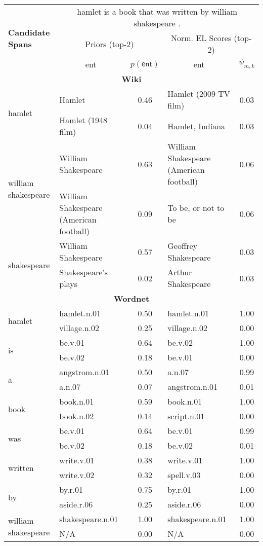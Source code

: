 \vspace{-0.1cm}
\begin{table}[t!]
\tiny
\centering
\begin{tabular}{|p{2.4cm}|p{2.8cm}c|p{2.8cm}c|}
\hline
\multirow{3}{*}{\textbf{Candidate Spans}} & \multicolumn{4}{c|}{\textsf{hamlet is a book that was written by william shakespeare . }} \\
& \multicolumn{2}{c}{Priors (top-2)} & \multicolumn{2}{c|}{Norm. EL Scores (top-2)} \\ \cline{2-5}
& \multicolumn{1}{c|}{\textsf{ent}} & $p(\mathsf{ent})$ & \multicolumn{1}{c|}{\textsf{ent}} & $\psi_{m,k}$ \\ \hline 
\multicolumn{5}{c}{\textbf{\textsf{Wiki}}}\\
\hline
\multirow{2}{*}{\textsf{hamlet}}& Hamlet & 0.46 & Hamlet (2009 TV film) & 0.03\\ 
& Hamlet (1948 film) & 0.04 & Hamlet, Indiana & 0.03\\\hline 
\multirow{2}{*}{\textsf{william shakespeare}}& William Shakespeare & 0.63 & William Shakespeare (American football) & 0.06\\ 
& William Shakespeare (American football) & 0.09 & To be, or not to be & 0.06\\\hline 
\multirow{2}{*}{\textsf{shakespeare}}& William Shakespeare & 0.57 & Geoffrey Shakespeare & 0.03\\ 
& Shakespeare's plays & 0.02 & Arthur Shakespeare & 0.03\\\hline 
\multicolumn{5}{c}{\textbf{\textsf{Wordnet}}}\\
\hline
\multirow{2}{*}{\textsf{hamlet}}& hamlet.n.01 & 0.50 & hamlet.n.01 & 1.00\\ 
& village.n.02 & 0.25 & village.n.02 & 0.00\\\hline 
\multirow{2}{*}{\textsf{is}}& be.v.01 & 0.64 & be.v.02 & 1.00\\ 
& be.v.02 & 0.18 & be.v.01 & 0.00\\\hline 
\multirow{2}{*}{\textsf{a}}& angstrom.n.01 & 0.50 & a.n.07 & 0.99\\ 
& a.n.07 & 0.07 & angstrom.n.01 & 0.01\\\hline 
\multirow{2}{*}{\textsf{book}}& book.n.01 & 0.59 & book.n.01 & 1.00\\ 
& book.n.02 & 0.14 & script.n.01 & 0.00\\\hline 
\multirow{2}{*}{\textsf{was}}& be.v.01 & 0.64 & be.v.01 & 0.99\\ 
& be.v.02 & 0.18 & be.v.02 & 0.01\\\hline 
\multirow{2}{*}{\textsf{written}}& write.v.01 & 0.38 & write.v.01 & 1.00\\ 
& write.v.02 & 0.32 & spell.v.03 & 0.00\\\hline 
\multirow{2}{*}{\textsf{by}}& by.r.01 & 0.75 & by.r.01 & 1.00\\ 
& aside.r.06 & 0.25 & aside.r.06 & 0.00\\\hline 
\multirow{2}{*}{\textsf{william shakespeare}}& shakespeare.n.01 & 1.00 & shakespeare.n.01 & 1.00\\ 
& N/A & 0.00 & N/A & 0.00\\\hline 
\end{tabular}
\end{table}